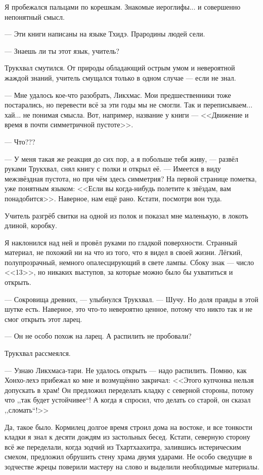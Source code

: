 Я пробежался пальцами по корешкам.
Знакомые иероглифы... и совершенно непонятный смысл.

--- Эти книги написаны на языке Тхидэ.
Прародины людей сели.

--- Знаешь ли ты этот язык, учитель?

Трукхвал смутился.
От природы обладающий острым умом и невероятной жаждой знаний, учитель смущался только в одном случае --- если не знал.

--- Мне удалось кое-что разобрать, Ликхмас.
Мои предшественники тоже постарались, но перевести всё за эти годы мы не смогли.
Так и переписываем... хай... не понимая смысла.
Вот, например, название у книги --- <<Движение и время в почти симметричной пустоте>>.

--- Что???

--- У меня такая же реакция до сих пор, а я побольше тебя живу, --- развёл руками Трукхвал, снял книгу с полки и открыл её.
--- Имеется в виду межзвёздная пустота, но при чём здесь симметрия?
На первой странице пометка, уже понятным языком: <<Если вы когда-нибудь полетите к звёздам, вам понадобится>>.
Наверное, нам ещё рано.
Кстати, посмотри вон туда.

Учитель разгрёб свитки на одной из полок и показал мне маленькую, в локоть длиной, коробку.

Я наклонился над ней и провёл руками по гладкой поверхности.
Странный материал, не похожий ни на что из того, что я видел в своей жизни.
Лёгкий, полупрозрачный, немного опалесцирующий в свете лампы.
Сбоку знак --- число <<13>>, но никаких выступов, за которые можно было бы ухватиться и открыть.

--- Сокровища древних, --- улыбнулся Трукхвал.
--- Шучу.
Но доля правды в этой шутке есть.
Наверное, это что-то невероятно ценное, потому что никто так и не смог открыть этот ларец.

--- Он не особо похож на ларец.
А распилить не пробовали?

Трукхвал рассмеялся.

--- Узнаю Ликхмаса-тари.
Не удалось открыть --- надо распилить.
Помню, как Хонхо-лехэ прибежал ко мне и возмущённо закричал: <<Этого купчонка нельзя допускать в храм!
Он предложил переделать кладку с северной стороны, потому что ,,так будет устойчивее``!
А когда я спросил, что делать со старой, он сказал ,,сломать``!>>

Да, такое было.
Кормилец долгое время строил дома на востоке, и все тонкости кладки я знал к десяти дождям из застольных бесед.
Кстати, северную сторону всё же переделали, когда зодчий из Тхартхаахитра, залившись истерическим смехом, предложил обрушить стену храма двумя ударами.
Не особо сведущие в зодчестве жрецы поверили мастеру на слово и выделили необходимые материалы.

